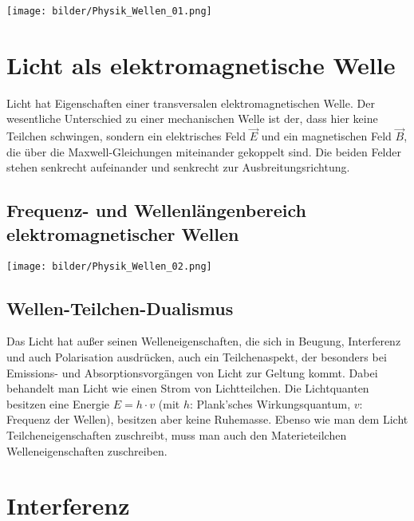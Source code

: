         \begin{center}
            \texttt{[image: bilder/Physik\_Wellen\_01.png]}
        \end{center}

\section{Licht als elektromagnetische Welle}
    
    Licht hat Eigenschaften einer transversalen elektromagnetischen Welle. Der wesentliche Unterschied zu einer mechanischen Welle ist der, dass hier keine Teilchen schwingen, sondern ein elektrisches Feld $\vec{E}$ und ein magnetischen Feld $\vec{B}$, die über die Maxwell-Gleichungen miteinander gekoppelt sind. Die beiden Felder stehen senkrecht aufeinander und senkrecht zur Ausbreitungsrichtung.

    \subsection{Frequenz- und Wellenlängenbereich elektromagnetischer Wellen}
        
        \begin{center}
            \texttt{[image: bilder/Physik\_Wellen\_02.png]}
        \end{center}
    
    \subsection{Wellen-Teilchen-Dualismus}
        
        Das Licht hat außer seinen Welleneigenschaften, die sich in Beugung, Interferenz und auch Polarisation ausdrücken, auch ein Teilchenaspekt, der besonders bei Emissions- und Absorptionsvorgängen von Licht zur Geltung kommt. Dabei behandelt man Licht wie einen Strom von Lichtteilchen. Die Lichtquanten besitzen eine Energie $E = h \cdot v$ (mit $h$: Plank'sches Wirkungsquantum, $v$: Frequenz der Wellen), besitzen aber keine Ruhemasse. Ebenso wie man dem Licht Teilcheneigenschaften zuschreibt, muss man auch den Materieteilchen Welleneigenschaften zuschreiben.

\section{Interferenz}


